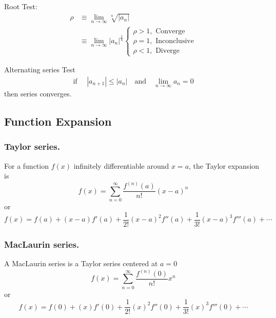 \documentclass[../../../main.tex]{subfiles}
\begin{document}
Root Test:
\begin{align*}
    \rho & \equiv\lim_{n\to \infty} \sqrt[ n]{|a_n|}     \\
         & \equiv \lim_{n\to \infty} |a_n|^{\frac{1}{n}}
    \begin{cases}
        \rho > 1,\textrm{ Converge} \\\rho = 1,\textrm{ Inconclusive}\\\rho < 1,\textrm{ Diverge}
    \end{cases}
\end{align*}

Alternating series Test
\begin{align*}
    \textrm{if }\quad|a_{n+1}|\leq|a_n|\quad \textrm{and} \quad\lim_{n\to \infty} a_n=0
\end{align*}
then series converges.

\subsection{Function Expansion}
\subsubsection{Taylor series.}
For a function $f(x)$ infinitely differentiable around $x=a$, the Taylor expansion is
\begin{equation*}
    f(x) = \sum_{n=0}^{\infty} \frac{f^{(n)}(a)}{n!}(x-a)^n
\end{equation*}
or
\begin{equation*}
    f(x)= f(a)+(x-a)f'(a)+\frac{1}{2!}(x-a)^2f''(a)+\frac{1}{3!}(x-a)^3f'''(a)+\cdots
\end{equation*}

\subsubsection{MacLaurin series.}
A MacLaurin series is a Taylor series centered at $a=0$
\begin{equation*}
    f(x) = \sum_{n=0}^{\infty} \frac{f^{(n)}(0)}{n!}x^n
\end{equation*}
or
\begin{equation*}
    f(x) = f(0)+(x)f'(0)+\frac{1}{2!}(x)^2f''(0)+\frac{1}{3!}(x)^3f'''(0)+\cdots
\end{equation*}
\end{document}
